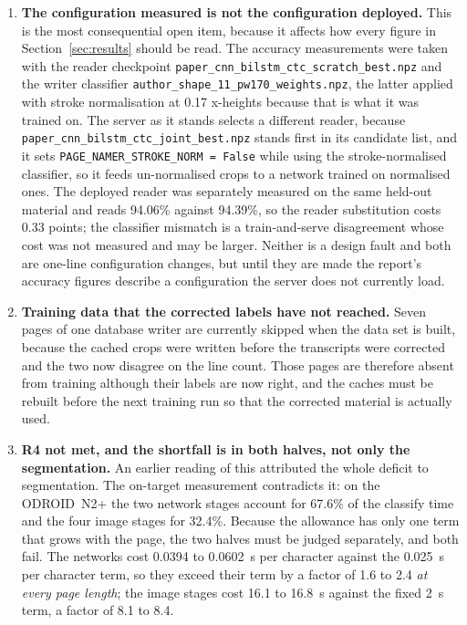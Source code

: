         \begin{enumerate}
          \item \textbf{The configuration measured is not the configuration deployed.} This is the most consequential open item, because it affects how every figure in Section~\ref{sec:results} should be read.
          The accuracy measurements were taken with the reader checkpoint \texttt{paper\_cnn\_bilstm\_ctc\_scratch\_best.npz} and the writer classifier \texttt{author\_shape\_11\_pw170\_weights.npz}, the latter applied with stroke normalisation at 0.17 x-heights because that is what it was trained on.
          The server as it stands selects a different reader, because \texttt{paper\_cnn\_bilstm\_ctc\_joint\_best.npz} stands first in its candidate list, and it sets \texttt{PAGE\_NAMER\_STROKE\_NORM = False} while using the stroke-normalised classifier, so it feeds un-normalised crops to a network trained on normalised ones.
          The deployed reader was separately measured on the same held-out material and reads 94.06\% against 94.39\%, so the reader substitution costs 0.33 points; the classifier mismatch is a train-and-serve disagreement whose cost was not measured and may be larger.
          Neither is a design fault and both are one-line configuration changes, but until they are made the report's accuracy figures describe a configuration the server does not currently load.
          \item \textbf{Training data that the corrected labels have not reached.} Seven pages of one database writer are currently skipped when the data set is built, because the cached crops were written before the transcripts were corrected and the two now disagree on the line count.
          Those pages are therefore absent from training although their labels are now right, and the caches must be rebuilt before the next training run so that the corrected material is actually used.
          \item \textbf{R4 not met, and the shortfall is in both halves, not only the segmentation.}
          An earlier reading of this attributed the whole deficit to segmentation. The on-target measurement contradicts it: on the ODROID~N2+ the two network stages account for 67.6\% of the classify time and the four image stages for 32.4\%.
          Because the allowance has only one term that grows with the page, the two halves must be judged separately, and both fail.
          The networks cost 0.0394 to 0.0602~s per character against the 0.025~s per character term, so they exceed their term by a factor of 1.6 to 2.4 \emph{at every page length}; the image stages cost 16.1 to 16.8~s against the fixed 2~s term, a factor of 8.1 to 8.4.

\end{enumerate}
